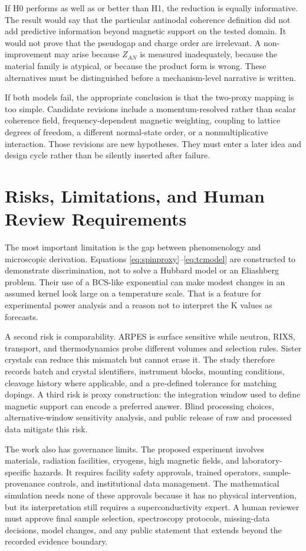 \documentclass[conference]{IEEEtran}
\begin{document}
If H0 performs as well as or better than H1, the reduction is equally informative. The result would say that the particular antinodal coherence definition did not add predictive information beyond magnetic support on the tested domain. It would not prove that the pseudogap and charge order are irrelevant. A non-improvement may arise because $Z_{AN}$ is measured inadequately, because the material family is atypical, or because the product form is wrong. These alternatives must be distinguished before a mechanism-level narrative is written.

If both models fail, the appropriate conclusion is that the two-proxy mapping is too simple. Candidate revisions include a momentum-resolved rather than scalar coherence field, frequency-dependent magnetic weighting, coupling to lattice degrees of freedom, a different normal-state order, or a nonmultiplicative interaction. Those revisions are new hypotheses. They must enter a later idea and design cycle rather than be silently inserted after failure.

\section{Risks, Limitations, and Human Review Requirements}

The most important limitation is the gap between phenomenology and microscopic derivation. Equations \eqref{eq:spinproxy}--\eqref{eq:tcmodel} are constructed to demonstrate discrimination, not to solve a Hubbard model or an Eliashberg problem. Their use of a BCS-like exponential can make modest changes in an assumed kernel look large on a temperature scale. That is a feature for experimental power analysis and a reason not to interpret the K values as forecasts.

A second risk is comparability. ARPES is surface sensitive while neutron, RIXS, transport, and thermodynamics probe different volumes and selection rules. Sister crystals can reduce this mismatch but cannot erase it. The study therefore records batch and crystal identifiers, instrument blocks, mounting conditions, cleavage history where applicable, and a pre-defined tolerance for matching dopings. A third risk is proxy construction: the integration window used to define magnetic support can encode a preferred answer. Blind processing choices, alternative-window sensitivity analysis, and public release of raw and processed data mitigate this risk.

The work also has governance limits. The proposed experiment involves materials, radiation facilities, cryogens, high magnetic fields, and laboratory-specific hazards. It requires facility safety approvals, trained operators, sample-provenance controls, and institutional data management. The mathematical simulation needs none of these approvals because it has no physical intervention, but its interpretation still requires a superconductivity expert. A human reviewer must approve final sample selection, spectroscopy protocols, missing-data decisions, model changes, and any public statement that extends beyond the recorded evidence boundary.
\end{document}
